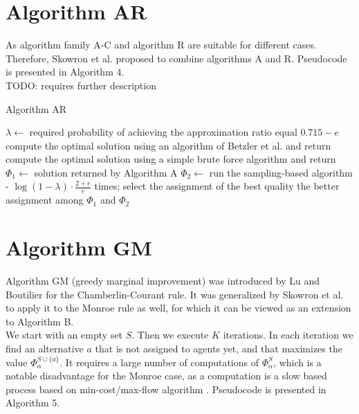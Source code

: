 \section{Algorithm AR}

As algorithm family A-C and algorithm R are suitable for different cases. Therefore, Skowron et al. \cite{1} proposed to combine algorithms A and R. Pseudocode is presented in Algorithm 4.
\\

TODO: requires further description

\begin{algorithm}
\caption{Algorithm AR}\label{euclid}
\begin{algorithmic}[1]
		\State $\lambda \gets$ required probability of achieving the approximation ratio equal $0.715 - e$
			\State compute the optimal solution using an algorithm of Betzler et al. \cite{3} and return
		\EndIf
			\State compute the optimal solution using a simple brute force algorithm and return
		\EndIf
		\State $\Phi_{1} \gets$ solution returned by Algorithm A
		\State $\Phi_{2} \gets$ run the sampling-based algorithm - $\log (1 - \lambda) \cdot \frac{2 + e}{e}$ times; select the assignment of the best quality
		\State \Return the better assignment among $\Phi_{1}$ and $\Phi_{2}$
	\EndProcedure
\end{algorithmic}
\end{algorithm}

\section{Algorithm GM}

Algorithm GM (greedy marginal improvement) was introduced by Lu and Boutilier \cite{4} for the Chamberlin-Courant rule. It was generalized by Skowron et al. \cite{1} to apply it to the Monroe rule as well, for which it can be viewed as an extension to Algorithm B.
\\

We start with an empty set $S$. Then we execute $K$ iterations. In each iteration we find an alternative $a$ that is not assigned to agents yet, and that maximizes the value $\Phi^{S \cup \{a\}}_{\alpha}$. It requires a large number of computations of $\Phi^{S}_{\alpha}$, which is a notable disadvantage for the Monroe case, as a computation is a slow based process based on min-cost/max-flow algorithm \cite{3}. Pseudocode is presented in Algorithm 5.


